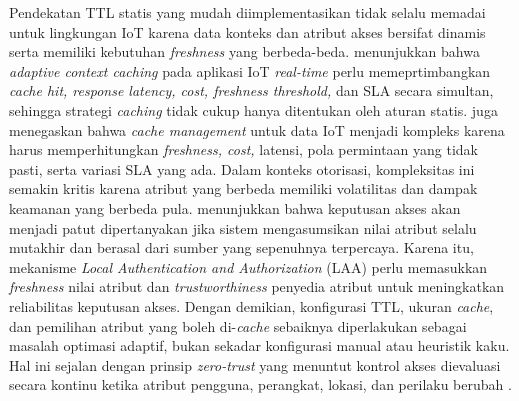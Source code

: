 Pendekatan TTL statis yang mudah diimplementasikan tidak selalu memadai untuk lingkungan IoT karena data konteks dan atribut akses bersifat dinamis serta memiliki kebutuhan \textit{freshness} yang berbeda-beda. \textcite{weerasinghe_adaptive_2023} menunjukkan bahwa \textit{adaptive context caching} pada aplikasi IoT \textit{real-time} perlu memeprtimbangkan \textit{cache hit, response latency, cost, freshness threshold,} dan SLA secara simultan, sehingga strategi \textit{caching} tidak cukup hanya ditentukan oleh aturan statis. \textcite{medvedev_refresh_2023} juga menegaskan bahwa \textit{cache management} untuk data IoT menjadi kompleks karena harus memperhitungkan \textit{freshness, cost,} latensi, pola permintaan yang tidak pasti, serta variasi SLA yang ada. Dalam konteks otorisasi, kompleksitas ini semakin kritis karena atribut yang berbeda memiliki volatilitas dan dampak keamanan yang berbeda pula. \textcite{wang_edge-enabled_2025} menunjukkan bahwa keputusan akses akan menjadi patut dipertanyakan jika sistem mengasumsikan nilai atribut selalu mutakhir dan berasal dari sumber yang sepenuhnya terpercaya. Karena itu, mekanisme \textit{Local Authentication and Authorization} (LAA) perlu memasukkan \textit{freshness} nilai atribut dan \textit{trustworthiness} penyedia atribut untuk meningkatkan reliabilitas keputusan akses. Dengan demikian, konfigurasi TTL, ukuran \textit{cache}, dan pemilihan atribut yang boleh di-\textit{cache} sebaiknya diperlakukan sebagai masalah optimasi adaptif, bukan sekadar konfigurasi manual atau heuristik kaku. Hal ini sejalan dengan prinsip \textit{zero-trust} yang menuntut kontrol akses dievaluasi secara kontinu ketika atribut pengguna, perangkat, lokasi, dan perilaku berubah \parencite{azad_verify_2024}.

